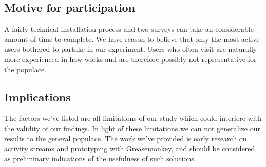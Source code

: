 \subsection{Motive for participation}

A fairly technical installation process and two surveys can take an
considerable amount of time to complete. We have reason to believe that only
the most active \urort{} users bothered to partake in our experiment. Users
who often visit \urort{} are naturally more experienced in how \urort{} works
and are therefore possibly not representative for the \urort{} populace.

\subsection{Implications}

The factors we've listed are all limitations of our study which could
interfere with the validity of our findings.
In light of these limitations we can not generalize
our results to the general \urort{} populace. The work we've
provided is early research on activity streams and prototyping with
Greasemonkey, and should be considered as preliminary indications of the
usefulness of such solutions.
